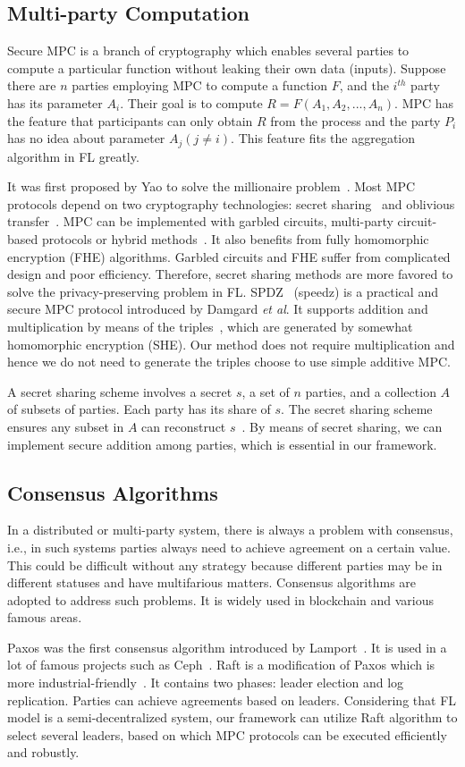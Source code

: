 \subsection{Multi-party Computation}
Secure MPC is a branch of cryptography which enables several parties to compute a particular function without leaking their own data (inputs). Suppose there are $n$ parties employing MPC to compute a function $F$, and the $i^{th}$ party has its parameter $A_i$. Their goal is to compute $R = F(A_1, A_2, ..., A_n)$. MPC has the feature that participants can only obtain $R$ from the process and the party $P_i$ has no idea about parameter $A_j (j \ne i)$. This feature fits the aggregation algorithm in FL greatly.

It was first proposed by Yao to solve the millionaire problem~\cite{Yao}. Most MPC protocols depend on two cryptography technologies: secret sharing~\cite{Shamir} and oblivious transfer~\cite{OT}. MPC can be implemented with garbled circuits, multi-party circuit-based protocols or hybrid methods~\cite{mpc-sok}. It also benefits from fully homomorphic encryption (FHE) algorithms. Garbled circuits and FHE suffer from complicated design and poor efficiency. Therefore, secret sharing methods are more favored to solve the privacy-preserving problem in FL. SPDZ~\cite{SPDZ} (speedz) is a practical and secure MPC protocol introduced by Damgard \emph{et al}. It supports addition and multiplication by means of the triples~\cite{Triple}, which are generated by somewhat homomorphic encryption (SHE). Our method does not require multiplication and hence we do not need to generate the triples choose to use simple additive MPC.

A secret sharing scheme involves a secret $s$, a set of $n$ parties, and a collection $A$ of subsets of parties. Each party has its share of $s$. The secret sharing scheme ensures any subset in $A$ can reconstruct $s$~\cite{Secret-Sharing-survey}. By means of secret sharing, we can implement secure addition among parties, which is essential in our framework.


\subsection{Consensus Algorithms}
In a distributed or multi-party system, there is always a problem with consensus, i.e., in such systems parties always need to achieve agreement on a certain value. This could be difficult without any strategy because different parties may be in different statuses and have multifarious matters. Consensus algorithms are adopted to address such problems. It is widely used in blockchain and various famous areas.

Paxos was the first consensus algorithm introduced by Lamport~\cite{Paxos}. It is used in a lot of famous projects such as Ceph~\cite{Ceph}. Raft is a modification of Paxos which is more industrial-friendly~\cite{Raft}. It contains two phases: leader election and log replication. Parties can achieve agreements based on leaders. Considering that FL model is a semi-decentralized system, our framework can utilize Raft algorithm to select several leaders, based on which MPC protocols can be executed efficiently and robustly.
